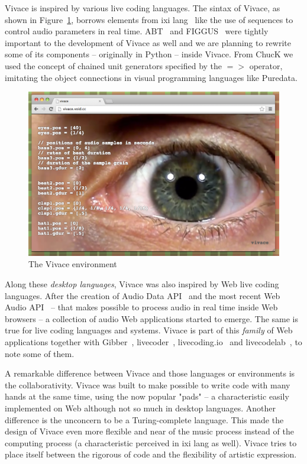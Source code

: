 \documentclass[letterpaper, 12pt]{article}
\begin{document}
Vivace is inspired by various live coding languages. The sintax of
Vivace, as shown in Figure~\ref{fig:vivace}, borrows elements from ixi
lang~\cite{magnusson2011ixi} like the use of sequences to control
audio parameters in real time. ABT~\cite{fabbri} and
FIGGUS~\cite{fabbri2} were tightly important to the development of
Vivace as well and we are planning to rewrite some of its components
-- originally in Python -- inside Vivace. From ChucK we used the
concept of chained unit generators specified by the $=>$ operator,
imitating the object connections in visual programming languages like
Puredata.

\begin{figure}[htpb]
  \begin{center}
    \includegraphics[scale=.3]{img/fig_vivace.png}
    \caption{The Vivace environment}
    \label{fig:vivace}
  \end{center}
\end{figure}

Along these \textit{desktop languages}, Vivace was also inspired by
Web live coding languages. After the creation of Audio Data
API~\cite{audiodata} and the most recent Web Audio API~\cite{webaudio}
-- that makes possible to process audio in real time inside Web
browsers -- a collection of audio Web applications started to
emerge. The same is true for live coding languages and systems. Vivace
is part of this \textit{family} of Web applications together with
Gibber~\cite{gibber}, livecoder~\cite{livecoder},
livecoding.io~\cite{livecodingio} and livecodelab~\cite{livecodelab},
to note some of them. 

A remarkable difference between Vivace and those languages or
environments is the collaborativity. Vivace was built to make possible
to write code with many hands at the same time, using the now popular
"pads" -- a characteristic easily implemented on Web although not so
much in desktop languages. Another difference is the unconcern to be a
Turing-complete language. This made the design of Vivace even more
flexible and near of the music process instead of the computing
process (a characteristic perceived in ixi lang as well). Vivace tries
to place itself between the rigorous of code and the flexibility of
artistic expression.
\end{document}

